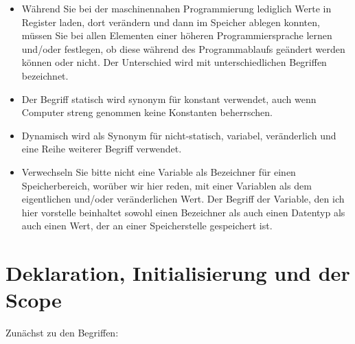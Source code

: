 \begin{itemize}
	\item Während Sie bei der maschinennahen Programmierung lediglich Werte in Register laden, dort verändern und dann im Speicher ablegen konnten, müssen Sie bei allen Elementen einer höheren Programmiersprache lernen und/oder festlegen, ob diese während des Programmablaufs geändert werden können oder nicht. Der Unterschied wird mit unterschiedlichen Begriffen bezeichnet.
	
	\item Der Begriff statisch wird synonym für konstant verwendet, auch wenn Computer streng genommen keine Konstanten beherrschen.
	
	\item Dynamisch wird als Synonym für nicht-statisch, variabel, veränderlich und eine Reihe weiterer Begriff verwendet.
	
	\item Verwechseln Sie bitte nicht eine Variable als Bezeichner für einen Speicherbereich, worüber wir hier reden, mit einer Variablen als dem eigentlichen und/oder veränderlichen Wert. Der Begriff der Variable, den ich hier vorstelle beinhaltet sowohl einen Bezeichner als auch einen Datentyp als auch einen Wert, der an einer Speicherstelle gespeichert ist.
\end{itemize}

\section{Deklaration, Initialisierung und der Scope}

Zunächst zu den Begriffen:

